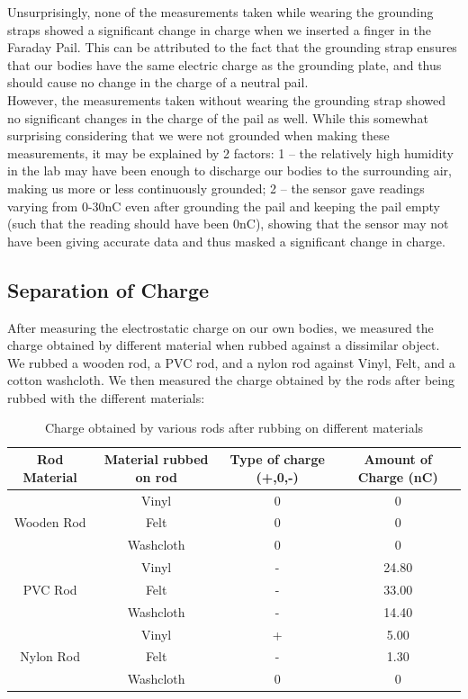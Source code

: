 \documentclass[12pt]{amsart}
\begin{document}
\indent Unsurprisingly, none of the measurements taken while wearing the grounding straps showed a significant change in charge when we inserted a finger in the Faraday Pail. This can be attributed to the fact that the grounding strap ensures that our bodies have the same electric charge as the grounding plate, and thus should cause no change in the charge of a neutral pail.\\
\indent However, the measurements taken without wearing the grounding strap showed no significant changes in the charge of the pail as well. While this somewhat surprising considering that we were not grounded when making these measurements, it may be explained by 2 factors: 1 -- the relatively high humidity in the lab may have been enough to discharge our bodies to the surrounding air, making us more or less continuously grounded; 2 -- the sensor gave readings varying from 0-30nC even after grounding the pail and keeping the pail empty (such that the reading should have been 0nC), showing that the sensor may not have been giving accurate data and thus masked a significant change in charge. 

\subsection{Separation of Charge}
\indent After measuring the electrostatic charge on our own bodies, we measured the charge obtained by different material when rubbed against a dissimilar object. We rubbed a wooden rod, a PVC rod, and a nylon rod against Vinyl, Felt, and a cotton washcloth. We then measured the charge obtained by the rods after being rubbed with the different materials:
\begin{table}[H]
	\begin{tabular}{ |c|c||c|c|}
		\hline
	
		\hline
		Rod Material & Material rubbed on rod& Type of charge (+,0,-)&Amount of Charge (nC)\\
		\hline
		\multirow{3}{*}{Wooden Rod} &Vinyl&0&0\\
		 &Felt&0&0\\
		&Washcloth&0&0\\
		\hline	
		\multirow{3}{*}{PVC Rod}&Vinyl&-&24.80\\
		&Felt&-&33.00\\
		&Washcloth&-&14.40\\
		\hline
		\multirow{3}{*}{Nylon Rod} &Vinyl&+&5.00\\
		&Felt&-&1.30\\
		&Washcloth&0&0\\
		\hline	
	\end{tabular}
\caption{Charge obtained by various rods after rubbing on different materials}
\end{table}
\end{document}
